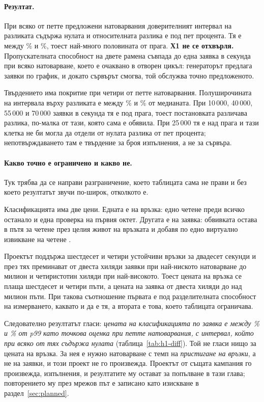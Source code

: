 \paragraph{Резултат.} При всяко от петте предложени натоварвания доверителният интервал на
разликата съдържа нулата и относителната разлика е под пет процента. Тя е между \%
и \%, тоест най-много половината от прага. \textbf{Х1 не се
отхвърля.} Пропускателната способност на двете рамена съвпада до една заявка в секунда при
всяко натоварване, което е очаквано в отворен цикъл: генераторът предлага заявки по график,
и докато сървърът смогва, той обслужва точно предложеното.

Твърдението има покритие при четири от петте натоварвания. Полуширочината на интервала
върху разликата е между \% и \%
от медианата. При 10\,000, 40\,000, 55\,000 и 70\,000 заявки в секунда тя е под прага, тоест
постановката различава разлика, по-малка от тази, която сама е обявила. При 25\,000 тя е над
прага и тази клетка не би могла да отдели от нулата разлика от пет процента;
непотвърждаването там е твърдение за броя изпълнения, а не за сървъра.

\paragraph{Какво точно е ограничено и какво не.} Тук трябва да се направи разграничение,
което таблицата сама не прави и без което резултатът звучи по-широк, отколкото е.

Класификацията има две цени. Едната е на връзка: едно четене преди всичко останало и една
проверка на първия октет. Другата е на заявка: обвивката  остава в
пътя за четене през целия живот на връзката и добавя по едно виртуално извикване на четене
.

Проектът поддържа шестдесет и четири устойчиви връзки за двадесет секунди и през тях
преминават от двеста хиляди заявки при най-ниското натоварване до милион и четиристотин
хиляди при най-високото. Тоест цената на връзка се плаща шестдесет и четири пъти, а цената
на заявка от двеста хиляди до над милион пъти. При такова съотношение първата е под
разделителната способност на измерването, каквато и да е тя, а втората е това, което
таблицата ограничава.

Следователно резултатът гласи: \emph{цената на класификацията по заявка е между
\% и \% от p99 като точкова оценка при петте
натоварвания, с интервал, който при всяко от тях съдържа нулата} (таблица~\ref{tab:h1-diff}).
Той не гласи нищо за цената на връзка. За нея е нужно натоварване с темп на
\emph{пристигане на връзки}, а не на заявки, и този проект не го произвежда. Проектът
 от същата кампания го произвежда,  изпълнения, и
резултатите му остават за попълване в тази глава; повторението му през мрежов път е записано
като изискване в раздел~\ref{sec:planned}.

